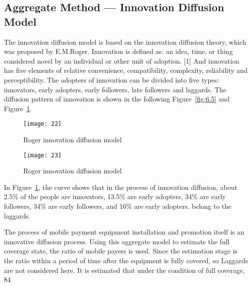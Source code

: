 \documentclass[../mcmpaper]{subfiles}
\begin{document}
\subsection{Aggregate Method --- Innovation Diffusion Model}
The innovation diffusion model is based on the innovation diffusion theory, which was proposed by E.M.Roger. Innovation is defined as: an idea, time, or thing considered novel by an individual or other unit of adoption. [1] And innovation has five elements of relative convenience, compatibility, complexity, reliability and perceptibility. The adopters of innovation can be divided into five types: innovators, early adopters, early followers, late followers and laggards. The diffusion pattern of innovation is shown in the following Figure~\ref{fig:6.5} and Figure~\ref{fig:6.6}.
\par
\begin{figure}[!ht]
\centering
\begin{minipage}[c]{\linewidth}
    \centering
    \texttt{[image: 22]}
    \caption{Roger innovation diffusion model}
    \label{fig:6.5}
\end{minipage}
\quad
\begin{minipage}[c]{\linewidth}
    \centering
    \texttt{[image: 23]}
    \caption{Roger innovation diffusion model}
     \label{fig:6.6}
\end{minipage}
\end{figure}
\par
In Figure~\ref{fig:6.6}, the curve shows that in the process of innovation diffusion, about 2.5\% of the people are innovators, 13.5\% are early adopters, 34\% are early followers, 34\% are early followers, and 16\% are early adopters. belong to the laggards.
\par
The process of mobile payment equipment installation and promotion itself is an innovative diffusion process. Using this aggregate model to estimate the full coverage state, the ratio of mobile payers is used. Since the estimation stage is the ratio within a period of time after the equipment is fully covered, so Laggards are not considered here. It is estimated that under the condition of full coverage, 84%
\end{document}
